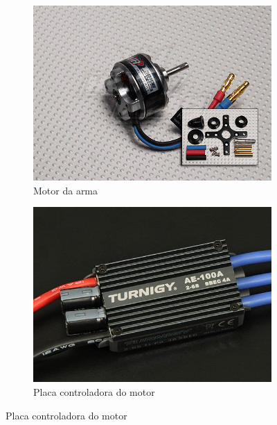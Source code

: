 \documentclass{article}
\begin{document}
                \begin{figure}[H]
                \centering
                \begin{subfigure}[b]{0.75\textwidth}
                    \includegraphics[width=\textwidth]{images/image04.jpg}
                    \caption{Motor da arma}
                \end{subfigure}
                \begin{subfigure}[b]{0.75\textwidth}
                    \includegraphics[width=\textwidth]{images/image03.jpg}
                    \caption{Placa controladora do motor}
                \end{subfigure}
                \end{figure}
\end{document}
